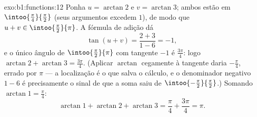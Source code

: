 \begin{solution}{exo:b1:functions:12}
Ponha $u = \arctan 2$ e $v = \arctan 3$; ambos estão em
$\intoo{\frac\pi4}{\frac\pi2}$ (seus argumentos excedem $1$), de modo que $u
+ v \in \intoo{\frac\pi2}{\pi}$. A fórmula de adição dá
\[
\tan(u + v) = \frac{2 + 3}{1 - 6} = -1 ,
\]
e o único ângulo de $\intoo{\frac\pi2}{\pi}$ com tangente $-1$
é $\frac{3\pi}4$: logo $\arctan 2 + \arctan 3 = \frac{3\pi}4$.
(Aplicar $\arctan$ cegamente à tangente daria
$-\frac\pi4$, errado por $\pi$ --- a localização é o que salva o
cálculo, e o denominador negativo $1 - 6$ é precisamente o
sinal de que a soma saiu de
$\intoo{-\frac\pi2}{\frac\pi2}$.) Somando $\arctan 1 = \frac\pi4$:
\[
\arctan 1 + \arctan 2 + \arctan 3 = \frac\pi4 + \frac{3\pi}4 = \pi .
\]
\end{solution}

